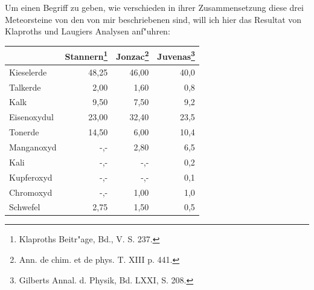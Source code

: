 \documentclass[a4paper, 11pt, oneside]{article}
\begin{document}
Um einen Begriff zu geben, wie verschieden in ihrer Zusammensetzung diese drei Meteorsteine von den von mir beschriebenen sind, will ich hier das Resultat von Klaproths und Laugiers Analysen anf"uhren:
\begin{center}
\begin{tabular}{ |l|r|r|r| }
    \hline
     & Stannern\footnote{Klaproths Beitr"age, Bd., V. S. 237.} & Jonzac\footnote{Ann. de chim. et de phys. T. XIII p. 441.} & Juvenas\footnote{Gilberts Annal. d. Physik, Bd. LXXI, S. 208.}\\\hline
    Kieselerde & 48,25 & 46,00 & 40,0\\\hline
    Talkerde & 2,00 & 1,60 & 0,8\\\hline
    Kalk & 9,50 & 7,50 & 9,2\\\hline
    Eisenoxydul & 23,00 & 32,40 & 23,5\\\hline
    Tonerde & 14,50 & 6,00 & 10,4\\\hline
    Manganoxyd & -,- & 2,80 & 6,5\\\hline
    Kali & -,- & -,- & 0,2\\\hline
    Kupferoxyd & -,- & -,- & 0,1\\\hline
    Chromoxyd & -,- & 1,00 & 1,0\\\hline
    Schwefel & 2,75 & 1,50 & 0,5\\
    \hline
\end{tabular}
\end{center}
\end{document}
